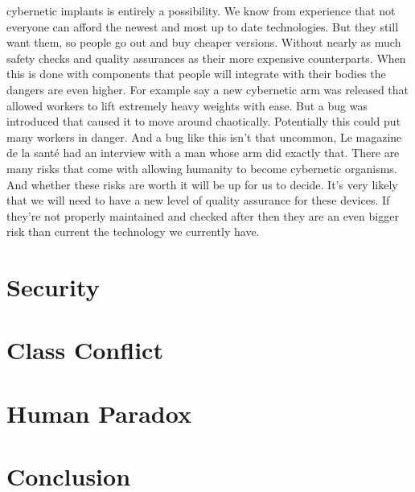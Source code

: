 \documentclass[12pt,a4paper,notitlepage]{article}
\begin{document}
cybernetic implants is entirely a possibility. We know from experience that not
everyone can afford the newest and most up to date technologies. But they still
want them, so people go out and buy cheaper versions. Without nearly as much
safety checks and quality assurances as their more expensive counterparts. When
this is done with components that people will integrate with their bodies the
dangers are even higher. For example say a new cybernetic arm was released that
allowed workers to lift extremely heavy weights with ease. But a bug was
introduced that caused it to move around chaotically. Potentially this could put
many workers in danger. And a bug like this isn't that uncommon, Le magazine de
la sant\'{e} had an interview with a man whose arm did exactly that. There are 
many risks that come with allowing humanity to become cybernetic organisms. And 
whether these risks are worth it will be up for us to decide. It's very likely 
that we will need to have a new level of quality assurance for these devices. If
they're not properly maintained and checked after then they are an even bigger 
risk than current the technology we currently have.


\section{Security}


\section{Class Conflict}


\section{Human Paradox}



\section{Conclusion}
\end{document}
